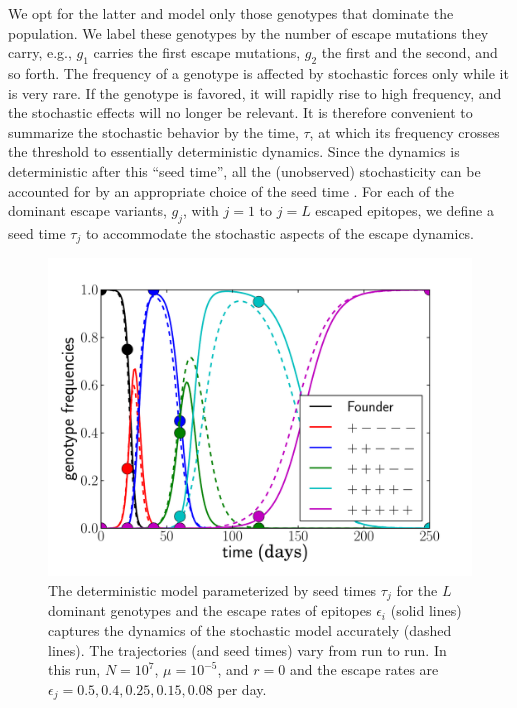 \documentclass{frontiers}
\newcommand{\gt}{g}
\newcommand{\fcoeff}{\epsilon}
\begin{document}
We opt for the latter and model only those genotypes that dominate the
population.  We label these genotypes by the number of escape mutations
they carry, e.g., $\gt_1$ carries the first escape mutations, $\gt_2$
the first and the second, and so forth.  The 
frequency of a genotype is
affected by stochastic forces only while it is very rare. If the
genotype is favored, it will rapidly rise to high frequency, and the
stochastic effects will no longer be relevant. It is therefore
convenient to summarize the stochastic behavior by the time, $\tau$,
at which its frequency crosses the threshold to essentially
deterministic dynamics.  Since the dynamics is deterministic after this
``seed time'', all the (unobserved) stochasticity can be accounted for by
an appropriate choice of the seed time
\citep{Kepler:1995p26819,Desai:2007p954}. For each of the dominant
escape variants, $\gt_j$, with $j=1$ to $j=L$ escaped epitopes, we define a
seed time $\tau_j$ to accommodate the stochastic aspects of the escape dynamics. 

\begin{figure}[tp]
\begin{center}
  \includegraphics[width=0.45\columnwidth]{figures_manuscript/sequential_traj_illustration.pdf}
  \caption[labelInTOC]{The deterministic model parameterized by seed times
  $\tau_j$ for the $L$ dominant genotypes and the escape rates of
  epitopes $\fcoeff_i$ 
  (solid lines) captures the dynamics of the stochastic model accurately
  (dashed lines). The trajectories (and seed times) vary from run to run. In this run,
$N = 10^7$, $\mu = 10^{-5}$, and $r = 0$ and the escape rates are
    $\fcoeff_j = 0.5, 0.4, 0.25, 0.15, 0.08$ per day.}
  \label{fig:model_vs_full}
\end{center}
\end{figure}
\end{document}
